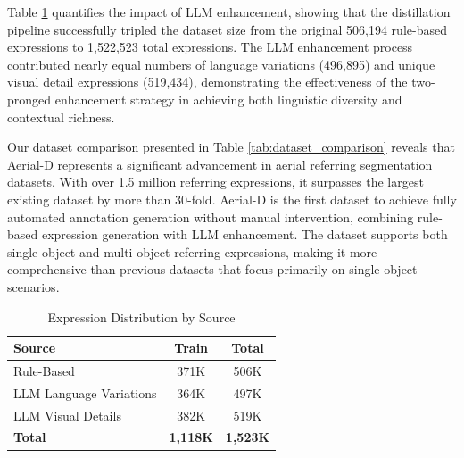 Table \ref{tab:llm_enhancement_stats} quantifies the impact of LLM enhancement, showing that the distillation pipeline successfully tripled the dataset size from the original 506,194 rule-based expressions to 1,522,523 total expressions. The LLM enhancement process contributed nearly equal numbers of language variations (496,895) and unique visual detail expressions (519,434), demonstrating the effectiveness of the two-pronged enhancement strategy in achieving both linguistic diversity and contextual richness.

Our dataset comparison presented in Table \ref{tab:dataset_comparison} reveals that Aerial-D represents a significant advancement in aerial referring segmentation datasets. With over 1.5 million referring expressions, it surpasses the largest existing dataset by more than 30-fold. Aerial-D is the first dataset to achieve fully automated annotation generation without manual intervention, combining rule-based expression generation with LLM enhancement. The dataset supports both single-object and multi-object referring expressions, making it more comprehensive than previous datasets that focus primarily on single-object scenarios.

\begin{table}[t]
\centering
\caption{Comparison with Existing RRSIS Datasets}
\label{tab:dataset_comparison}
\end{table}

\begin{table}[H]
\centering
\caption{Expression Distribution by Source}
\label{tab:llm_enhancement_stats}
\footnotesize
\begin{tabular}{@{}lcc@{}}
\toprule
\textbf{Source} & \textbf{Train} & \textbf{Total} \\
\midrule
Rule-Based & 371K & 506K \\
LLM Language Variations & 364K & 497K \\
LLM Visual Details & 382K & 519K \\
\midrule
\textbf{Total} & \textbf{1,118K} & \textbf{1,523K} \\
\bottomrule
\end{tabular}
\end{table}
